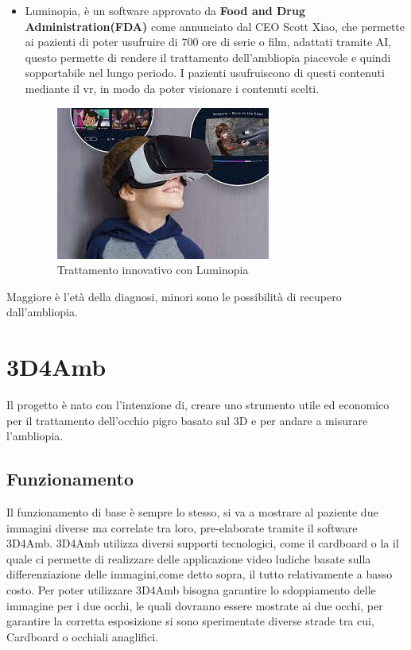 \documentclass[10pt,a4paper]{article}
\begin{document}
\begin{itemize}
		\item Luminopia, è un software approvato da  \textbf{Food and Drug Administration(FDA)} come annunciato dal CEO Scott Xiao, che permette ai pazienti di poter usufruire di 700 ore di serie o film, adattati tramite AI, questo permette di rendere il trattamento dell'ambliopia piacevole e quindi sopportabile nel lungo periodo.
		I pazienti usufruiscono di questi contenuti mediante il vr, in modo da poter visionare i contenuti scelti.
			\begin{figure}[h]
				\centering
				\includegraphics[width=0.7\linewidth]{image/luminopia}
				\caption{Trattamento innovativo con Luminopia}
				\label{fig:luminopia}
			\end{figure}
	\end{itemize}
	Maggiore è l'età della diagnosi, minori sono le possibilità di recupero dall'ambliopia.\\
	\newpage
	\section{3D4Amb}
	Il progetto è nato con l'intenzione di, creare uno strumento utile ed economico per il trattamento dell'occhio pigro basato sul 3D e per andare a misurare l'ambliopia.
	
	\subsection{Funzionamento}
	Il funzionamento di base è sempre lo stesso, si va a mostrare al paziente due immagini diverse ma correlate tra loro, pre-elaborate tramite il software 3D4Amb.
	3D4Amb utilizza diversi supporti tecnologici, come il cardboard o la il quale ci permette di realizzare delle applicazione video ludiche basate sulla differenziazione delle immagini,come detto sopra, il tutto relativamente a basso costo.
	Per poter utilizzare 3D4Amb bisogna garantire lo sdoppiamento delle immagine per i due occhi, le quali dovranno essere mostrate ai due occhi, per garantire la corretta esposizione si sono sperimentate diverse strade tra cui, Cardboard o occhiali anaglifici.
\end{document}
